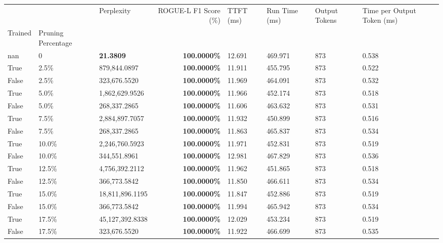 \begin{table}[H]
{\label{tab:evaluation-pipeline-6}
\begin{tabular}{lllrllll}
\toprule
 &  & Perplexity & ROGUE-L F1 Score (\%) & TTFT (ms) & Run Time (ms) & Output Tokens & Time per Output Token (ms) \\
Trained & Pruning Percentage &  &  &  &  &  &  \\
\midrule
nan & 0 & \bfseries 21.3809 & \bfseries 100.0000\% & 12.691 & 469.971 & 873 & 0.538 \\
\cline{1-8}
True & 2.5\% & 879,844.0897 & \bfseries \color{red} 100.0000\% & 11.911 & 455.795 & 873 & 0.522 \\
\cline{1-8}
False & 2.5\% & 323,676.5520 & \bfseries \color{red} 100.0000\% & 11.969 & 464.091 & 873 & 0.532 \\
\cline{1-8}
True & 5.0\% & 1,862,629.9526 & \bfseries \color{red} 100.0000\% & 11.966 & 452.174 & 873 & 0.518 \\
\cline{1-8}
False & 5.0\% & \color{red} 268,337.2865 & \bfseries \color{red} 100.0000\% & 11.606 & 463.632 & 873 & 0.531 \\
\cline{1-8}
True & 7.5\% & 2,884,897.7057 & \bfseries \color{red} 100.0000\% & 11.932 & 450.899 & 873 & 0.516 \\
\cline{1-8}
False & 7.5\% & \color{red} 268,337.2865 & \bfseries \color{red} 100.0000\% & 11.863 & 465.837 & 873 & 0.534 \\
\cline{1-8}
True & 10.0\% & 2,246,760.5923 & \bfseries \color{red} 100.0000\% & 11.971 & 452.831 & 873 & 0.519 \\
\cline{1-8}
False & 10.0\% & 344,551.8961 & \bfseries \color{red} 100.0000\% & 12.981 & 467.829 & 873 & 0.536 \\
\cline{1-8}
True & 12.5\% & 4,756,392.2112 & \bfseries \color{red} 100.0000\% & 11.962 & 451.865 & 873 & 0.518 \\
\cline{1-8}
False & 12.5\% & 366,773.5842 & \bfseries \color{red} 100.0000\% & 11.850 & 466.611 & 873 & 0.534 \\
\cline{1-8}
True & 15.0\% & 18,811,896.1195 & \bfseries \color{red} 100.0000\% & 11.847 & 452.886 & 873 & 0.519 \\
\cline{1-8}
False & 15.0\% & 366,773.5842 & \bfseries \color{red} 100.0000\% & 11.994 & 465.942 & 873 & 0.534 \\
\cline{1-8}
True & 17.5\% & 45,127,392.8338 & \bfseries \color{red} 100.0000\% & 12.029 & 453.234 & 873 & 0.519 \\
\cline{1-8}
False & 17.5\% & 323,676.5520 & \bfseries \color{red} 100.0000\% & 11.922 & 466.699 & 873 & 0.535 \\

\end{tabular}}
\end{table}
